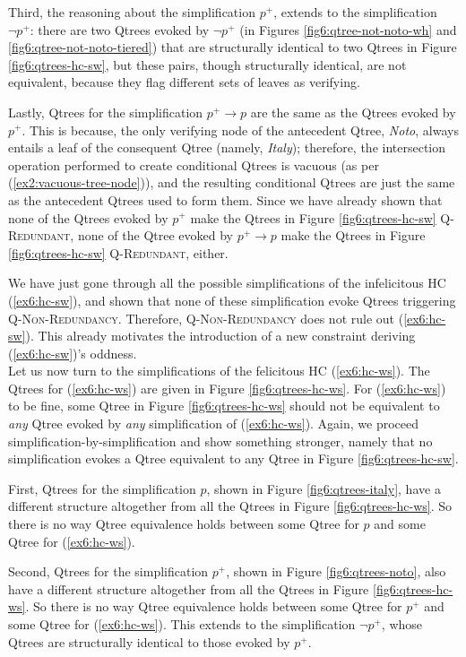 Third, the reasoning about the simplification $p^+$, extends to the simplification $\neg p^+$: there are two Qtrees evoked by $\neg p^+$ (in Figures \ref{fig6:qtree-not-noto-wh} and \ref{fig6:qtree-not-noto-tiered}) that are structurally identical to two Qtrees in Figure \ref{fig6:qtrees-hc-sw}, but these pairs, though structurally identical, are not equivalent, because they flag different sets of leaves as verifying.

Lastly, Qtrees for the simplification $p^+\rightarrow p$ are the same as the Qtrees evoked by $p^+$. This is because, the only verifying node of the antecedent Qtree, \textit{Noto}, always entails a leaf of the consequent Qtree (namely, \textit{Italy}); therefore, the intersection operation performed to create conditional Qtrees is vacuous (as per (\ref{ex2:vacuous-tree-node})), and the resulting conditional Qtrees are just the same as the antecedent Qtrees used to form them. Since we have already shown that none of the Qtrees evoked by $p^+$ make the Qtrees in Figure \ref{fig6:qtrees-hc-sw} \textsc{Q-Redundant}, none of the Qtree evoked by $p^+\rightarrow p$ make the Qtrees in Figure \ref{fig6:qtrees-hc-sw} \textsc{Q-Redundant}, either.

We have just gone through all the possible simplifications of the infelicitous HC (\ref{ex6:hc-sw}), and shown that none of these simplification evoke Qtrees triggering \textsc{Q-Non-Redundancy}. Therefore, \textsc{Q-Non-Redundancy} does not rule out (\ref{ex6:hc-sw}). This already motivates the introduction of a new constraint deriving (\ref{ex6:hc-sw})'s oddness.\\

Let us now turn to the simplifications of the felicitous HC (\ref{ex6:hc-ws}). The Qtrees for (\ref{ex6:hc-ws}) are given in Figure \ref{fig6:qtrees-hc-ws}. For (\ref{ex6:hc-ws}) to be fine, some Qtree in Figure \ref{fig6:qtrees-hc-ws}  should not be equivalent to \textit{any} Qtree evoked by \textit{any} simplification of (\ref{ex6:hc-ws}). Again, we proceed simplification-by-simplification and show something stronger, namely that no simplification evokes a Qtree equivalent to any Qtree in Figure \ref{fig6:qtrees-hc-sw}.

First, Qtrees for the simplification $p$, shown in Figure \ref{fig6:qtrees-italy}, have a different structure altogether from all the Qtrees in Figure \ref{fig6:qtrees-hc-ws}. So there is no way Qtree equivalence holds between some Qtree for $p$ and some Qtree for (\ref{ex6:hc-ws}).

Second, Qtrees for the simplification $p^+$, shown in Figure \ref{fig6:qtrees-noto}, also have a different structure altogether from all the Qtrees in Figure \ref{fig6:qtrees-hc-ws}. So there is no way Qtree equivalence holds between some Qtree for $p^+$ and some Qtree for (\ref{ex6:hc-ws}). This extends to the simplification $\neg p^+$, whose Qtrees are structurally identical to those evoked by $p^+$.


